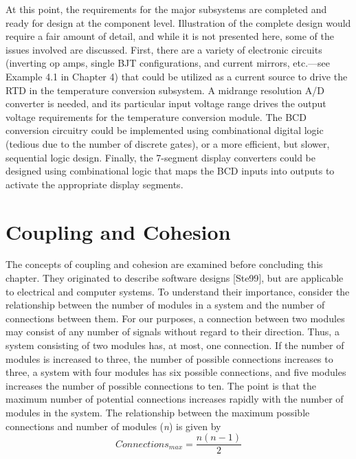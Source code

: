 At this point, the requirements for the major subsystems are completed
and ready for design at the component level. Illustration of the
complete design would require a fair amount of detail, and while it is
not presented here, some of the issues involved are discussed. First,
there are a variety of electronic circuits (inverting op amps, single
BJT configurations, and current mirrors, etc.---see Example 4.1 in
Chapter 4) that could be utilized as a current source to drive the RTD
in the temperature conversion subsystem. A midrange resolution A/D
converter is needed, and its particular input voltage range drives the
output voltage requirements for the temperature conversion module. The
BCD conversion circuitry could be implemented using combinational
digital logic (tedious due to the number of discrete gates), or a more
efficient, but slower, sequential logic design. Finally, the 7-segment
display converters could be designed using combinational logic that maps
the BCD inputs into outputs to activate the appropriate display
segments.

\section{Coupling and Cohesion}
\label{section:coupling-and-cohesion}

The concepts of coupling and cohesion are examined before concluding
this chapter. They originated to describe software designs {[}Ste99{]},
but are applicable to electrical and computer systems. To understand
their importance, consider the relationship between the number of
modules in a system and the number of connections between them. For our
purposes, a connection between two modules may consist of any number of
signals without regard to their direction. Thus, a system consisting of
two modules has, at most, one connection. If the number of modules is
increased to three, the number of possible connections increases to
three, a system with four modules has six possible connections, and five
modules increases the number of possible connections to ten. The point
is that the maximum number of potential connections increases rapidly
with the number of modules in the system. The relationship between the
maximum possible connections and number of modules (\emph{n}) is given
by
$$Connections_{max} = \frac{n(n-1)}{2}$$

